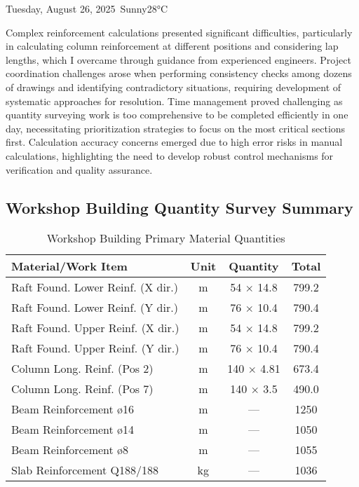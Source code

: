 \begin{dailyentry}{Tuesday, August 26, 2025}{\weathersunny\ Sunny}{28°C}
\begin{challenges}
\item[] Complex reinforcement calculations presented significant difficulties, particularly in calculating column reinforcement at different positions and considering lap lengths, which I overcame through guidance from experienced engineers. Project coordination challenges arose when performing consistency checks among dozens of drawings and identifying contradictory situations, requiring development of systematic approaches for resolution. Time management proved challenging as quantity surveying work is too comprehensive to be completed efficiently in one day, necessitating prioritization strategies to focus on the most critical sections first. Calculation accuracy concerns emerged due to high error risks in manual calculations, highlighting the need to develop robust control mechanisms for verification and quality assurance.
\end{challenges}

\vspace{1cm}

\subsection*{Workshop Building Quantity Survey Summary}

\begin{table}[ht]
\centering
\caption{Workshop Building Primary Material Quantities}
\begin{tabular}{@{}p{5.5cm}ccc@{}}
\toprule
\textbf{Material/Work Item} & \textbf{Unit} & \textbf{Quantity} & \textbf{Total} \\
\midrule
Raft Found. Lower Reinf. (X dir.) & m & 54 $\times$ 14.8 & 799.2 \\
Raft Found. Lower Reinf. (Y dir.) & m & 76 $\times$ 10.4 & 790.4 \\
Raft Found. Upper Reinf. (X dir.) & m & 54 $\times$ 14.8 & 799.2 \\
Raft Found. Upper Reinf. (Y dir.) & m & 76 $\times$ 10.4 & 790.4 \\
\midrule
Column Long. Reinf. (Pos 2) & m & 140 $\times$ 4.81 & 673.4 \\
Column Long. Reinf. (Pos 7) & m & 140 $\times$ 3.5 & 490.0 \\
\midrule
Beam Reinforcement \o16 & m & --- & 1250 \\
Beam Reinforcement \o14 & m & --- & 1050 \\
Beam Reinforcement \o8 & m & --- & 1055 \\
\midrule
Slab Reinforcement Q188/188 & kg & --- & 1036 \\
\bottomrule
\end{tabular}
\end{table}


\end{dailyentry}
